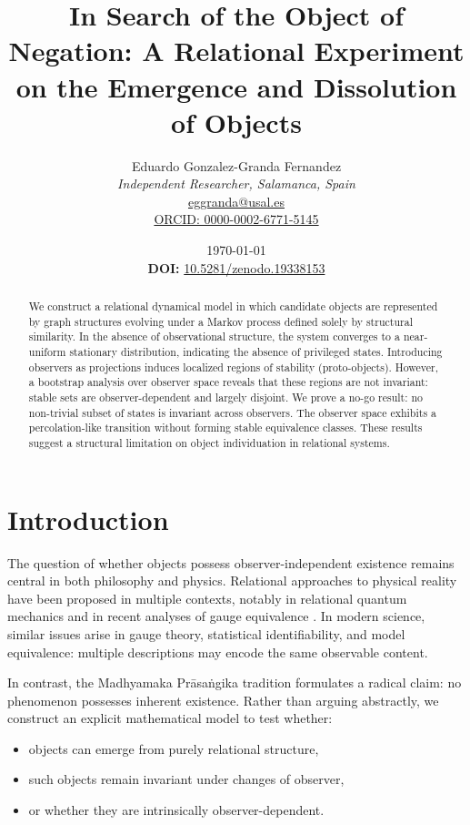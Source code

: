 \documentclass[11pt]{article}
\title{In Search of the Object of Negation: A Relational Experiment on the Emergence and Dissolution of Objects}
\author{Eduardo Gonzalez-Granda Fernandez\\
\textit{Independent Researcher, Salamanca, Spain}\\
\href{mailto:eggranda@usal.es}{eggranda@usal.es}\\
\href{https://orcid.org/0000-0002-6771-5145}{ORCID: 0000-0002-6771-5145}
}
\date{\today \\ \vspace{0.4cm} 
\textbf{DOI:} \href{https://doi.org/10.5281/zenodo.19338153}{10.5281/zenodo.19338153}}
\begin{document}
\maketitle

\begin{abstract}
We construct a relational dynamical model in which candidate objects are represented by graph structures evolving under a Markov process defined solely by structural similarity. In the absence of observational structure, the system converges to a near-uniform stationary distribution, indicating the absence of privileged states. Introducing observers as projections induces localized regions of stability (proto-objects). However, a bootstrap analysis over observer space reveals that these regions are not invariant: stable sets are observer-dependent and largely disjoint. We prove a no-go result: no non-trivial subset of states is invariant across observers. The observer space exhibits a percolation-like transition without forming stable equivalence classes. These results suggest a structural limitation on object individuation in relational systems.
\end{abstract}

\section{Introduction}

The question of whether objects possess observer-independent existence remains central in both philosophy and physics. Relational approaches to physical reality have been proposed in multiple contexts, notably in relational quantum mechanics \cite{rovelli_relational} and in recent analyses of gauge equivalence \cite{weatherall}. In modern science, similar issues arise in gauge theory, statistical identifiability, and model equivalence: multiple descriptions may encode the same observable content.

In contrast, the Madhyamaka Prāsaṅgika tradition formulates a radical claim: no phenomenon possesses inherent existence. Rather than arguing abstractly, we construct an explicit mathematical model to test whether:

\begin{itemize}
    \item objects can emerge from purely relational structure,
    \item such objects remain invariant under changes of observer,
    \item or whether they are intrinsically observer-dependent.
\end{itemize}
\end{document}
